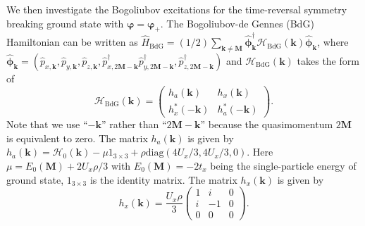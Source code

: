 \documentclass[aps,pra,floatfix,twocolumn,superscriptaddress]{revtex4-1}
\begin{document}
We then investigate the Bogoliubov excitations for the time-reversal symmetry breaking ground state with $\bm{\varphi}=\bm{\varphi}_+$. The Bogoliubov-de Gennes (BdG) Hamiltonian can be written as
$\hat{H}_{\mathrm{BdG}}=(1/2)\sum_{\mathbf{k}\neq\mathbf{M}}
\hat{\bm{\phi}}_\mathbf{k}^\dagger
\mathcal{H}_{\mathrm{BdG}}(\mathbf{k})
\hat{\bm{\phi}}_\mathbf{k}$, where $\hat{\bm{\phi}}_\mathbf{k}=(\hat{p}_{x,\mathbf{k}},\hat{p}_{y,\mathbf{k}},\hat{p}_{z,\mathbf{k}},\hat{p}_{x,2\mathbf{M}-\mathbf{k}}^\dagger\hat{p}_{y,2\mathbf{M}-\mathbf{k}}^\dagger,\hat{p}_{z,2\mathbf{M}-\mathbf{k}}^\dagger)$ and $\mathcal{H}_{\mathrm{BdG}}(\mathbf{k})$ takes the form of
\begin{equation}
\mathcal{H}_{\mathrm{BdG}}(\mathbf{k})=\left(\begin{array}{cc}
h_{a}(\mathbf{k}) & h_{x}(\mathbf{k})\\
h_{x}^{*}(-\mathbf{k}) & h_a^*(-\mathbf{k})
\end{array}\right).
\end{equation}
Note that we use ``$-\mathbf{k}$'' rather than ``$2\mathbf{M}-\mathbf{k}$'' because the quasimomentum $2\mathbf{M}$ is equivalent to zero. The matrix $h_a(\mathbf{k})$ is given by $h_a(\mathbf{k})=\mathcal{H}_0(\mathbf{k})-\mu 1_{3\times 3}+\rho \mathrm{diag}(4U_x/3,4U_x/3,0)$. Here $\mu=E_0(\mathbf{M})+2U_x\rho/3$ with $E_0(\mathbf{M})=-2t_x$ being the single-particle energy of ground state, $1_{3\times 3}$ is the identity matrix. The matrix $h_{x}(\mathbf{k})$ is given by
\begin{equation}
h_{x}(\mathbf{k})=\frac{U_x\rho}{3}\left(\begin{array}{ccc}
		1 & i & 0\\
		i & -1 & 0\\
		0 & 0 & 0
	\end{array}\right).
\end{equation}
\end{document}

